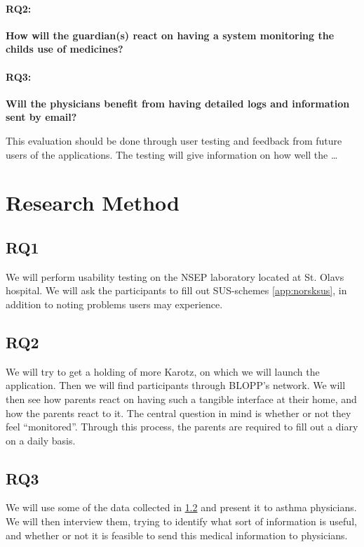 \paragraph{RQ2:}
\textbf{How will the guardian(s) react on having a system monitoring the childs use of medicines?}


\paragraph{RQ3:}
\textbf{Will the physicians benefit from having detailed logs and information sent by email?}

This evaluation should be done through user testing and feedback from future users of the applications. The testing will give information on how well the 
\ldots

\section{Research Method}
\label{sec:researchmethod}

\subsection{RQ1}
\label{sec: RQ1-methodology}
We will perform usability testing on the NSEP laboratory located at St. Olavs hospital. We will ask the participants to fill out SUS-schemes \ref{app:norsksus}, in addition to noting problems users may experience. 


\subsection{RQ2}
\label{sec: RQ2-methodology}
We will try to get a holding of more Karotz, on which we will launch the application. Then we will find participants through BLOPP's network. We will then see how parents react on having such a tangible interface at their home, and how the parents react to it. The central question in mind is whether or not they feel ``monitored''. Through this process, the parents are required to fill out a diary on a daily basis. 


\subsection{RQ3}
\label{sec: RQ3-methodology}
We will use some of the data collected in \ref{sec: RQ2-methodology} and present it to asthma physicians. We will then interview them, trying to identify what sort of information is useful, and whether or not it is feasible to send this medical information to physicians.    

